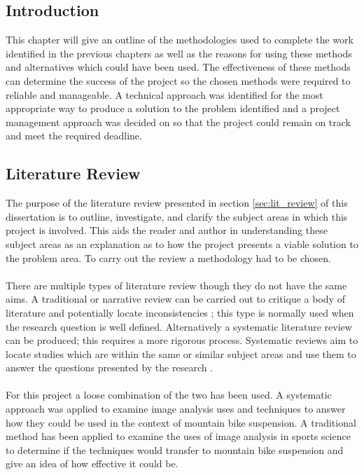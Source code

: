 \subsection{Introduction}
	This chapter will give an outline of the methodologies used to complete the work identified in the previous chapters as well as the reasons for using these methods and alternatives which could have been used. The effectiveness of these methods can determine the success of the project so the chosen methods were required to reliable and manageable. A technical approach was identified for the most appropriate way to produce a solution to the problem identified and a project management approach was decided on so that the project could remain on track and meet the required deadline.
\subsection{Literature Review}
	The purpose of the literature review presented in section \ref{sec:lit_review} of this dissertation is to outline, investigate, and clarify the subject areas in which this project is involved. This aids the reader and author in understanding these subject areas as an explanation as to how the project presents a viable solution to the problem area. To carry out the review a methodology had to be chosen.
	\\\\
	There are multiple types of literature review though they do not have the same aims. A traditional or narrative review can be carried out to critique a body of literature and potentially locate inconsistencies ; this type is normally used when the research question is well defined. Alternatively a systematic literature review can be produced; this requires a more rigorous process. Systematic reviews aim to locate studies which are within the same or similar subject areas and use them to answer the questions presented by the research .
	\\\\
	For this project a loose combination of the two has been used. A systematic approach was applied to examine image analysis uses and techniques to answer how they could be used in the context of mountain bike suspension. A traditional method has been applied to examine the uses of image analysis in sports science to determine if the techniques would transfer to mountain bike suspension and give an idea of how effective it could be. 
